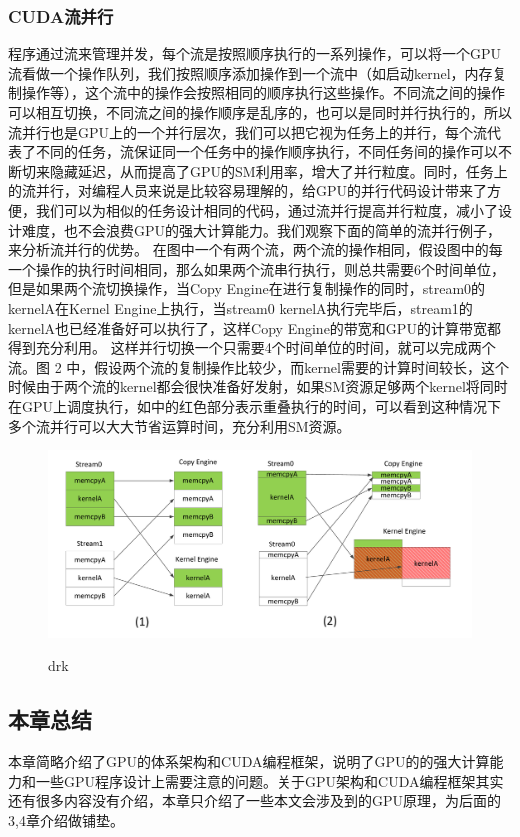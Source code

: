 \subsubsection{CUDA流并行}
程序通过流来管理并发，每个流是按照顺序执行的一系列操作，可以将一个GPU流看做一个操作队列，我们按照顺序添加操作到一个流中（如启动kernel，内存复制操作等），这个流中的操作会按照相同的顺序执行这些操作。不同流之间的操作可以相互切换，不同流之间的操作顺序是乱序的，也可以是同时并行执行的，所以流并行也是GPU上的一个并行层次，我们可以把它视为任务上的并行，每个流代表了不同的任务，流保证同一个任务中的操作顺序执行，不同任务间的操作可以不断切来隐藏延迟，从而提高了GPU的SM利用率，增大了并行粒度。同时，任务上的流并行，对编程人员来说是比较容易理解的，给GPU的并行代码设计带来了方便，我们可以为相似的任务设计相同的代码，通过流并行提高并行粒度，减小了设计难度，也不会浪费GPU的强大计算能力。我们观察下面的简单的流并行例子，来分析流并行的优势。
在图中一个有两个流，两个流的操作相同，假设图中的每一个操作的执行时间相同，那么如果两个流串行执行，则总共需要6个时间单位，但是如果两个流切换操作，当Copy Engine在进行复制操作的同时，stream0的kernelA在Kernel Engine上执行，当stream0 kernelA执行完毕后，stream1的kernelA也已经准备好可以执行了，这样Copy Engine的带宽和GPU的计算带宽都得到充分利用。
这样并行切换一个只需要4个时间单位的时间，就可以完成两个流。图 2 中，假设两个流的复制操作比较少，而kernel需要的计算时间较长，这个时候由于两个流的kernel都会很快准备好发射，如果SM资源足够两个kernel将同时在GPU上调度执行，如中的红色部分表示重叠执行的时间，可以看到这种情况下多个流并行可以大大节省运算时间，充分利用SM资源。
\begin{figure}
\setlength{\belowcaptionskip}{-0.5cm}
  \begin{center}
    {\includegraphics[width=1 \textwidth]{figures/flow.pdf}}
    \end{center}
  \caption{{\footnotesize{drk}}}
  \label{drk}
\end{figure}
\subsection{本章总结}
本章简略介绍了GPU的体系架构和CUDA编程框架，说明了GPU的的强大计算能力和一些GPU程序设计上需要注意的问题。关于GPU架构和CUDA编程框架其实还有很多内容没有介绍，本章只介绍了一些本文会涉及到的GPU原理，为后面的3,4章介绍做铺垫。